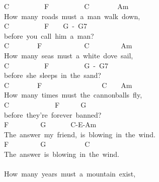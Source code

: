 \documentclass[]{book}
\begin{document}
C~~~~~~~~~~F~~~~~~~~~~C~~~~~~~~Am~~\\
How~many~roads~must~a~man~walk~down,~\\
\hspace*{0.333em}\hspace*{0.333em}\hspace*{0.333em}C~~~~~~~~~~F~~~~G~-~G7\\
before~you~call~him~a~man?\\
C~~~~~~~~F~~~~~~~~~~~~C~~~~~~~~~Am~~\\
How~many~seas~must~a~white~dove~sail,~\\
\hspace*{0.333em}\hspace*{0.333em}\hspace*{0.333em}C~~~~~~~~~~F~~~~~~~~~~G~-~G7\\
before~she~sleeps~in~the~sand?\\
C~~~~~~~~F~~~~~~~~~~~~~~~~~C~~~~Am\\
How~many~times~must~the~cannonballs~fly,~\\
\hspace*{0.333em}\hspace*{0.333em}\hspace*{0.333em}C~~~~~~~~~~~~~F~~~~~~G~\\
before~they're~forever~banned?\\
\hspace*{0.333em}\hspace*{0.333em}\hspace*{0.333em}\hspace*{0.333em}\hspace*{0.333em}\hspace*{0.333em}\hspace*{0.333em}F~~~~~~~~~G~~~~~~~C-E-Am~~~~~~~~~~~~~\\
The~answer~my~friend,~is~blowing~in~the~wind.\\
\hspace*{0.333em}\hspace*{0.333em}\hspace*{0.333em}\hspace*{0.333em}\hspace*{0.333em}\hspace*{0.333em}\hspace*{0.333em}F~~~~~~~~~G~~~~~~~~~~~C\\
The~answer~is~blowing~in~the~wind.\\
~\\
How~many~years~must~a~mountain~exist,~\\
\end{document}
